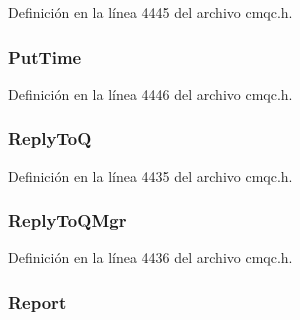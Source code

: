 Definición en la línea 4445 del archivo cmqc.\+h.

\hypertarget{structtag_m_q_m_d_aec51e7b9face9480a893ae5d47781ee7}{}
\subsubsection[{Put\+Time}]{ Put\+Time}\label{structtag_m_q_m_d_aec51e7b9face9480a893ae5d47781ee7}


Definición en la línea 4446 del archivo cmqc.\+h.

\hypertarget{structtag_m_q_m_d_a7073875015f870e1d1a02e988ce698b3}{}
\subsubsection[{Reply\+To\+Q}]{ Reply\+To\+Q}\label{structtag_m_q_m_d_a7073875015f870e1d1a02e988ce698b3}


Definición en la línea 4435 del archivo cmqc.\+h.

\hypertarget{structtag_m_q_m_d_a9364487d587c0a06d95c25d1ae05a0be}{}
\subsubsection[{Reply\+To\+Q\+Mgr}]{ Reply\+To\+Q\+Mgr}\label{structtag_m_q_m_d_a9364487d587c0a06d95c25d1ae05a0be}


Definición en la línea 4436 del archivo cmqc.\+h.

\hypertarget{structtag_m_q_m_d_a3e6ae3e2f087fe6fc26cc75004fbc790}{}
\subsubsection[{Report}]{ Report}\label{structtag_m_q_m_d_a3e6ae3e2f087fe6fc26cc75004fbc790}


